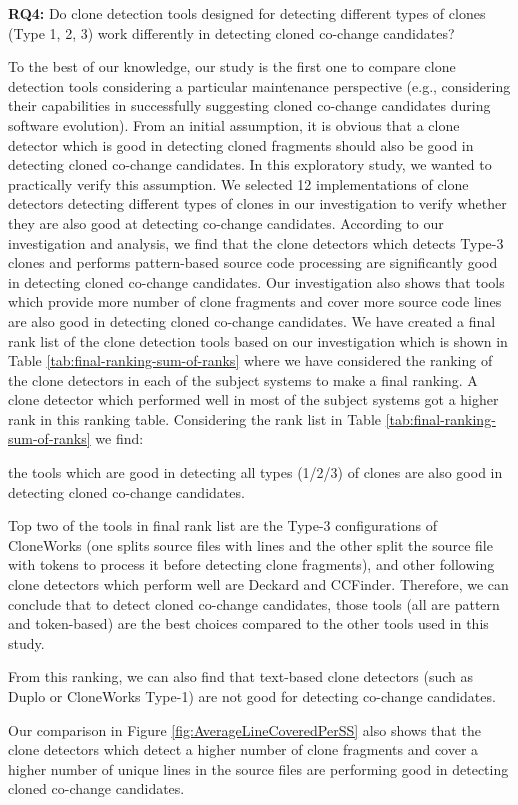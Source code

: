\documentclass[review]{elsarticle}
\begin{document}
\vspace{0.15cm}
\noindent
\textbf{RQ4: }Do clone detection tools designed for detecting different types of clones (Type 1, 2, 3) work differently in detecting cloned co-change candidates?

To the best of our knowledge, our study is the first one to compare clone detection tools considering a particular maintenance perspective (e.g., considering their capabilities in successfully suggesting cloned co-change candidates during software evolution). From an initial assumption, it is obvious that a clone detector which is good in detecting cloned fragments should also be good in detecting cloned co-change candidates. In this exploratory study, we wanted to practically verify this assumption. We selected 12 implementations of clone detectors detecting different types of clones in our investigation to verify whether they are also good at detecting co-change candidates. According to our investigation and analysis, we find that the clone detectors which detects Type-3 clones and performs pattern-based source code processing are significantly good in detecting cloned co-change candidates. Our investigation also shows that tools which provide more number of clone fragments and cover more source code lines are also good in detecting cloned co-change candidates. We have created a final rank list of the clone detection tools based on our investigation which is shown in Table \ref{tab:final-ranking-sum-of-ranks} where we have considered the ranking of the clone detectors in each of the subject systems to make a final ranking. A clone detector which performed well in most of the subject systems got a higher rank in this ranking table. Considering the rank list in Table \ref{tab:final-ranking-sum-of-ranks} we find:
\begin{enumerate*}[label=(\roman*)]
  \item the tools which are good in detecting all types (1/2/3) of clones are also good in detecting cloned co-change candidates. 
  \item Top two of the tools in final rank list are the Type-3 configurations of CloneWorks (one splits source files with lines and the other split the source file with tokens to process it before detecting clone fragments), and other following clone detectors which perform well are Deckard and CCFinder. Therefore, we can conclude that to detect cloned co-change candidates, those tools (all are pattern and token-based) are the best choices compared to the other tools used in this study.
  \item From this ranking, we can also find that text-based clone detectors (such as Duplo or CloneWorks Type-1) are not good for detecting co-change candidates.
  \item Our comparison in Figure \ref{fig:AverageLineCoveredPerSS} also shows that the clone detectors which detect a higher number of clone fragments and cover a higher number of unique lines in the source files are performing good in detecting cloned co-change candidates. 
\end{enumerate*}
\end{document}

